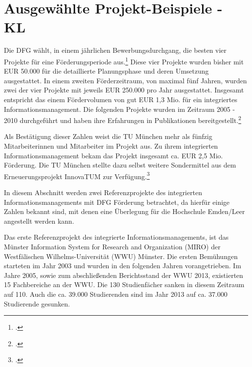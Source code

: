
\section{Ausgewählte Projekt-Beispiele - KL}

\label{section_projekt_beispiele}
Die DFG wählt, in einem jährlichen Bewerbungsdurchgang, die besten vier Projekte für eine Förderungsperiode aus.\footcite[Für Auskünfte steht Ihnen aktuell Frau Holzer (E-Mail: Angela.Holzer@dfg.de Tel.: 0228/885-2344) Rede und Antwort,][]{dfg_42_merkblatt} Diese vier Projekte wurden bisher mit EUR 50.000 für die detaillierte Planungsphase und deren Umsetzung ausgestattet. In einem zweiten Förderzeitraum, von maximal fünf Jahren, wurden zwei der vier Projekte mit jeweils EUR 250.000 pro Jahr ausgestattet.
Insgesamt entspricht das einem Fördervolumen von gut EUR 1,3 Mio. für ein integriertes Informationsmanagement.
Die folgenden Projekte wurden im Zeitraum 2005 - 2010 durchgeführt und haben ihre Erfahrungen in Publikationen bereitgestellt.\footcite{kerres_hochschulen_2005}

Als Bestätigung dieser Zahlen weist die TU München mehr als fünfzig Mitarbeiterinnen und Mitarbeiter im Projekt aus. Zu ihrem integrierten Informationsmanagement bekam das Projekt insgesamt ca. EUR 2,5 Mio. Förderung. Die TU München stellte dazu selbst weitere Sondermittel aus dem Erneuerungsprojekt InnovaTUM zur Verfügung.\footcite{bode_informationsmanagement_2010}

In diesem Abschnitt werden zwei Referenzprojekte des integrierten Informationsmanagements mit DFG Förderung betrachtet, da hierfür einige Zahlen bekannt sind, mit denen eine Überlegung für die Hochschule Emden/Leer angestellt werden kann.


Das erste Referenzprojekt des integrierte Informationsmanagements, ist das Münster Information System for Research and Organization (MIRO) der Westfälischen Wilhelms-Universität (WWU) Münster. Die ersten Bemühungen starteten im Jahr 2003 und wurden in den folgenden Jahren vorangetrieben. Im Jahre 2005, sowie zum abschließenden Berichtsstand der WWU 2013, existierten 15 Fachbereiche an der WWU. Die 130 Studienfächer sanken in diesem Zeitraum auf 110. Auch die ca. 39.000 Studierenden sind im Jahr 2013 auf ca. 37.000 Studierende gesunken.


